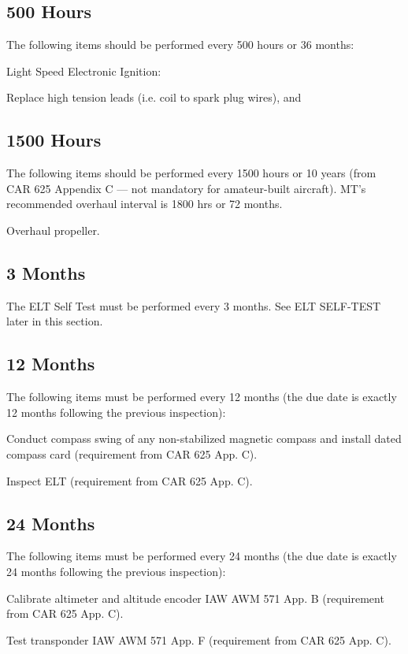 \subsection{500 Hours} The following items should be performed every 500 hours or 36 months:
\begin{enumerate*}
	\item Light Speed Electronic Ignition: 
	\begin{enumerate*}
		\item Replace high tension leads (i.e. coil to spark plug wires), and 
	\end{enumerate*}
\end{enumerate*}

\subsection{1500 Hours} The following items should be performed every 1500 hours or 10 years (from CAR 625 Appendix C --- not mandatory for amateur-built aircraft). MT's recommended overhaul interval is 1800 hrs or 72 months.
\begin{enumerate*}
	\item Overhaul propeller. 
\end{enumerate*}

\subsection{3 Months} The ELT Self Test must be performed every 3 months.  See ELT SELF-TEST later in this section.

\subsection{12 Months} The following items must be performed every 12 months (the due date is exactly 12 months following the previous inspection):
\begin{enumerate*}
	\item Conduct compass swing of any non-stabilized magnetic compass and install dated compass card (requirement from CAR 625 App. C).
	\item Inspect ELT (requirement from CAR 625 App. C).
\end{enumerate*}

\subsection{24 Months} The following items must be performed every 24 months (the due date is exactly 24 months following the previous inspection):
\begin{enumerate*}
	\item Calibrate altimeter and altitude encoder IAW AWM 571 App. B (requirement from CAR 625 App. C).
	\item Test transponder IAW AWM 571 App. F (requirement from CAR 625 App. C).
\end{enumerate*}

